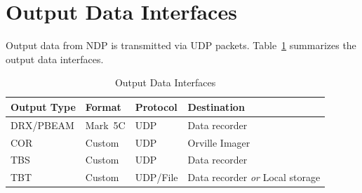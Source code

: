 \section{Output Data Interfaces}

Output data from NDP is transmitted via UDP packets.  Table~\ref{tab:output-interfaces} summarizes the output data interfaces.

\begin{table}[htbp]
    \centering
    \caption{Output Data Interfaces}
    \label{tab:output-interfaces}
    \begin{tabular}{llll}
        \toprule
        \textbf{Output Type} & \textbf{Format} & \textbf{Protocol} & \textbf{Destination} \\
        \midrule
        DRX/PBEAM & Mark~5C & UDP & Data recorder \\
        COR & Custom & UDP & Orville Imager \\
        TBS & Custom & UDP & Data recorder \\
        TBT & Custom & UDP/File & Data recorder \textit{or} Local storage \\
        \bottomrule
    \end{tabular}
\end{table}
